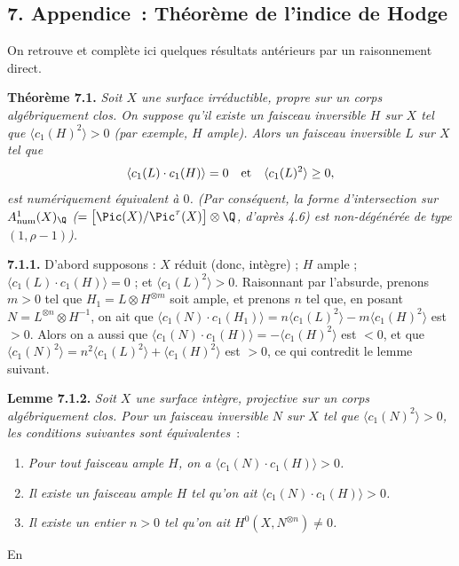 \subsection*{7. Appendice~: Th\'eor\`eme de l'indice de Hodge}

On retrouve et compl\`ete ici quelques r\'esultats ant\'erieurs par un raisonnement direct.

\textbf{Th\'eor\`eme 7.1.} \emph{Soit $X$ une surface irr\'eductible, propre sur un corps alg\'ebriquement clos. On suppose qu'il existe un faisceau inversible $H$ sur $X$ tel que $\langle c_1(H)^2\rangle>0$ (par exemple, $H$ ample). Alors un faisceau inversible $L$ sur $X$ tel que}
\[
   \langle c_1(L)\cdot c_1(H)\rangle=0
   \quad\hbox{et}\quad
   \langle c_1(L)^2\rangle\geq 0,
\]
\emph{est num\'eriquement \'equivalent \`a $0$. (Par cons\'equent, la forme d'intersection sur $A^1_{\mathrm{num}}(X)_{\Q}$ ($=\bigl[\Pic(X)/\Pic^\tau(X)\bigr]\otimes\Q$, d'apr\`es 4.6) est non-d\'eg\'en\'er\'ee de type $(1,\rho-1)$).}

\textbf{7.1.1.} D'abord supposons : $X$ r\'eduit (donc, int\`egre) ; $H$ ample ; $\langle c_1(L)\cdot c_1(H)\rangle=0$ ; et $\langle c_1(L)^2\rangle>0$. Raisonnant par l'absurde, prenons $m>0$ tel que $H_1=L\otimes H^{\otimes m}$ soit ample, et prenons $n$ tel que, en posant $N=L^{\otimes n}\otimes H^{-1}$, on ait que $\langle c_1(N)\cdot c_1(H_1)\rangle=n\langle c_1(L)^2\rangle-m\langle c_1(H)^2\rangle$ est $>0$. Alors on a aussi que $\langle c_1(N)\cdot c_1(H)\rangle=-\langle c_1(H)^2\rangle$ est $<0$, et que $\langle c_1(N)^2\rangle=n^2\langle c_1(L)^2\rangle+\langle c_1(H)^2\rangle$ est $>0$, ce qui contredit le lemme suivant.

\textbf{Lemme 7.1.2.} \emph{Soit $X$ une surface int\`egre, projective sur un corps alg\'ebriquement clos. Pour un faisceau inversible $N$ sur $X$ tel que $\langle c_1(N)^2\rangle>0$, les conditions suivantes sont \'equivalentes}~:
\begin{enumerate}[label=(\roman*)]
\item \emph{Pour tout faisceau ample $H$, on a $\langle c_1(N)\cdot c_1(H)\rangle>0$.}
\item[(i')] \emph{Il existe un faisceau ample $H$ tel qu'on ait $\langle c_1(N)\cdot c_1(H)\rangle>0$.}
\item \emph{Il existe un entier $n>0$ tel qu'on ait $H^0(X,N^{\otimes n})\ne0$.}
\end{enumerate}
En
